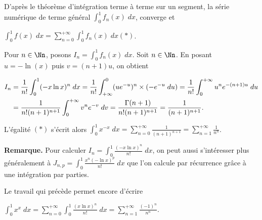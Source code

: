 {{D'après le théorème d'intégration terme à terme sur un segment, la série numérique de terme général $\int_{0}^{1}f_n(x)\;dx$, converge et

\begin{center}
$\int_{0}^{1}f(x)\;dx=\sum_{n=0}^{+\infty}\int_{0}^{1}f_n(x)\;dx$\quad$(*)$.
\end{center}

Pour $n\in\Nn$, posons $I_n=\int_{0}^{1}f_n(x)\;dx$. Soit $n\in\Nn$. En posant $u=-\ln(x)$ puis $v=(n+1)u$, on obtient

\begin{align*}\ensuremath
I_n&=\frac{1}{n!}\int_{0}^{1}(-x\ln x)^n\;dx=\frac{1}{n!}\int_{+\infty}^{0}(ue^{-u})^n\times(-e^{-u}\;du)=\frac{1}{n!}\int_{0}^{+\infty}u^ne^{-(n+1)u}\;du\\
 &=\frac{1}{n!(n+1)^{n+1}}\int_{0}^{+\infty}v^ne^{-v}\;dv=\frac{\Gamma(n+1)}{n!(n+1)^{n+1}}=\frac{1}{(n+1)^{n+1}}.
\end{align*}

L'égalité $(*)$ s'écrit alors $\int_{0}^{1}x^{-x}\;dx=\sum_{n=0}^{+\infty}\frac{1}{(n+1)^{n+1}}=\sum_{n=1}^{+\infty}\frac{1}{n^n}$.

\textbf{Remarque.} Pour calculer $I_n=\int_{0}^{1}\frac{(-x\ln x)^n}{n!}\;dx$, on peut aussi s'intéresser plus généralement à $J_{n,p}=\int_{0}^{1}\frac{x^n(-\ln x)^p}{n!}\;dx$ que l'on calcule par récurrence grâce à une intégration par parties.

Le travail qui précède permet encore d'écrire

\begin{center}
$\int_{0}^{1}x^x\;dx=\sum_{n=0}^{+\infty}\int_{0}^{1}\frac{(x\ln x)^n}{n!}\;dx=\sum_{n=1}^{+\infty}\frac{(-1)^n}{n^n}$.
\end{center}

\begin{center}
\end{center}
}
}
